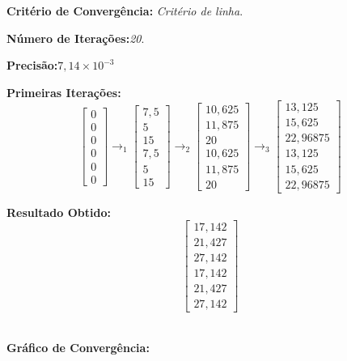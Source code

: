 \documentclass[
	12pt,				%
	openright,			%
	twoside,			%
	a4paper,			%
	english,			%
	french,				%
	spanish,			%
	brazil				%
	]{abntex2_new}
\begin{document}
 \begin{alineas}
 	\item{\textbf{Critério de Convergência:} \textit{Critério de linha}.}
 	\item{\textbf{Número de Iterações:}\textit{20}.}
 	\item{\textbf{Precisão:}\textit{$7,14 \times 10^{-3}$}}
 	\item{\textbf{Primeiras Iterações:}\\
 $$	\begin{bmatrix}
 		0\\
 		0\\
 		0\\
 		0\\
 		0\\
 		0
 	\end{bmatrix} \rightarrow_1
 	\begin{bmatrix}
 	7,5\\
 	5\\
 	15\\
 	7,5\\
 	5\\
 	15
 	\end{bmatrix} \rightarrow_2
 		\begin{bmatrix}
 		10,625\\
 		11,875\\
 		20\\
 		10,625\\
 		11,875\\
 		20
 		\end{bmatrix} \rightarrow_3
 		\begin{bmatrix}
 		13,125\\
 		15,625\\
 		22,96875\\
 		13,125\\
 		15,625\\
 		22,96875
 		\end{bmatrix}$$
 }
 \item{\textbf{Resultado Obtido:}}\\
$$\begin{bmatrix}
 	17,142\\
 	21,427\\
 	27,142\\
 	17,142\\
 	21,427\\
 	27,142
 \end{bmatrix}$$\\
 \clearpage
 \item{\textbf{Gráfico de Convergência:}}
 

\end{alineas}
\end{document}
